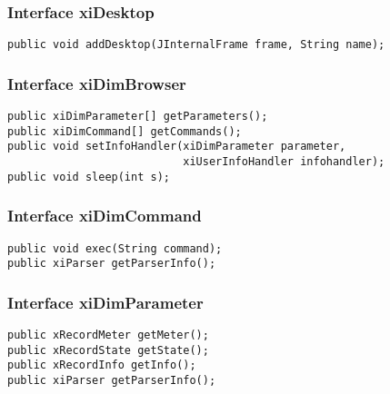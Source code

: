 \subsubsection{Interface xiDesktop}
{\tt public void addDesktop(JInternalFrame frame, String name);}

\subsubsection{Interface xiDimBrowser}
\begin{verbatim}
public xiDimParameter[] getParameters();
public xiDimCommand[] getCommands();
public void setInfoHandler(xiDimParameter parameter, 
                           xiUserInfoHandler infohandler);
public void sleep(int s);
\end{verbatim}

\subsubsection{Interface xiDimCommand}
\begin{verbatim}
public void exec(String command);
public xiParser getParserInfo();
\end{verbatim}

\subsubsection{Interface xiDimParameter}
\begin{verbatim}
public xRecordMeter getMeter();
public xRecordState getState();
public xRecordInfo getInfo();
public xiParser getParserInfo();
\end{verbatim}

